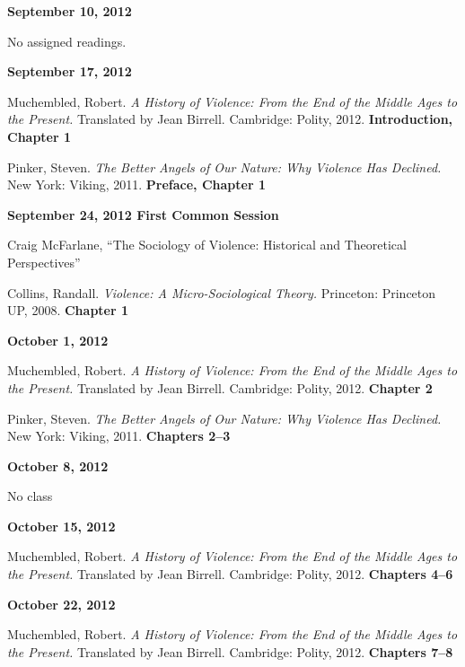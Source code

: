 \documentclass[12pt]{article}
\begin{document}
\vspace{.125in}

\textbf{September 10, 2012}

No assigned readings.

\textbf{September 17, 2012}

\begin{hangparas}{.5in}{1}
Muchembled, Robert. \textit{A History of Violence: From the End of the Middle Ages to the Present.} Translated by Jean Birrell. Cambridge: Polity, 2012. \textbf{Introduction, Chapter 1}

Pinker, Steven. \textit{The Better Angels of Our Nature: Why Violence Has Declined.} New York: Viking, 2011. \textbf{Preface, Chapter 1}
\end{hangparas}

\textbf{September 24, 2012 \hspace{.125in} First Common Session}

Craig McFarlane, ``The Sociology of Violence: Historical and Theoretical Perspectives''

\begin{hangparas}{.5in}{1}
Collins, Randall. \textit{Violence: A Micro-Sociological Theory.} Princeton: Princeton UP, 2008. \textbf{Chapter 1}
\end{hangparas}

\textbf{October 1, 2012}

\begin{hangparas}{.5in}{1}
Muchembled, Robert. \textit{A History of Violence: From the End of the Middle Ages to the Present.} Translated by Jean Birrell. Cambridge: Polity, 2012. \textbf{Chapter 2}

Pinker, Steven. \textit{The Better Angels of Our Nature: Why Violence Has Declined.} New York: Viking, 2011. \textbf{Chapters 2--3}
\end{hangparas}

\textbf{October 8, 2012}

No class

\textbf{October 15, 2012}

\begin{hangparas}{.5in}{1}
Muchembled, Robert. \textit{A History of Violence: From the End of the Middle Ages to the Present.} Translated by Jean Birrell. Cambridge: Polity, 2012. \textbf{Chapters 4--6}
\end{hangparas}

\textbf{October 22, 2012}

\begin{hangparas}{.5in}{1}
Muchembled, Robert. \textit{A History of Violence: From the End of the Middle Ages to the Present.} Translated by Jean Birrell. Cambridge: Polity, 2012. \textbf{Chapters 7--8}
\end{hangparas}
\end{document}
